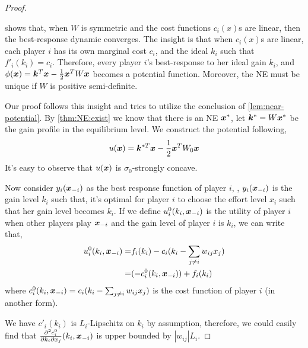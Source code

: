 \begin{proof}
\label{prf:thm:NE:unique:near-symmetric}

\citet{public-network-direct-BRD:bayer2023best} shows that, when $W$ is symmetric and the cost functions $c_i(x)$s are linear, then the best-response dynamic converges. The insight is that when $c_i(x)$s are linear, each player $i$ has its own marginal cost $c_i$, and the ideal $k_i$ such that $f'_i(k_i) = c_i$. Therefore, every player $i$'s best-response to her ideal gain $k_i$, and $\phi({\bm{x}}) = {\bm{k}}^T {\bm{x}} - \frac{1}{2} {\bm{x}}^T W {\bm{x}}$ becomes a potential function. Moreover, the NE must be unique if $W$ is positive semi-definite.

Our proof follows this insight and tries to utilize the conclusion of \cref{lem:near-potential}. By \cref{thm:NE:exist} we know that there is an NE ${\bm{x}}^*$, let ${\bm{k}}^* = W {\bm{x}}^*$ be the gain profile in the equilibrium level. We construct the potential following,
\begin{align*}
    u({\bm{x}}) = {\bm{k}}^{*T} {\bm{x}} - \frac{1}{2} {\bm{x}}^T W_0 {\bm{x}}
\end{align*}
It's easy to observe that $u({\bm{x}})$ is $\sigma_0$-strongly concave.

Now consider $y_i({\bm{x}}_{-i})$ as the best response function of player $i$, \ie, $y_i({\bm{x}}_{-i})$ is the gain level $k_i$ such that, it's optimal for player $i$ to choose the effort level $x_i$ such that her gain level becomes $k_i$. 
If we define $u^0_i(k_i,{\bm{x}}_{-i})$ is the utility of player $i$ when other players play ${\bm{x}}_{-i}$ and the gain level of player $i$ is $k_i$, we can write that,
\begin{align*}
    u^0_i(k_i,{\bm{x}}_{-i}) =& f_i(k_i) - c_i(k_i - \sum_{j\ne i} w_{ij} x_j)
    \\
    =& (- c^0_i(k_i, {\bm{x}}_{-i})) + f_i(k_i)
\end{align*}
where $c^0_i(k_i, {\bm{x}}_{-i}) = c_i(k_i - \sum_{j\ne i} w_{ij} x_j)$ is the cost function of player $i$ (in another form).



We have $c'_i(k_i)$ is $L_i$-Lipschitz on $k_i$ by assumption, therefore, we could easily find that $\frac{\partial^2 c^0_i}{\partial k_i \partial x_j}(k_i,{\bm{x}}_{-i})$ is upper bounded by $|w_{ij}| L_i$. 


\end{proof}
